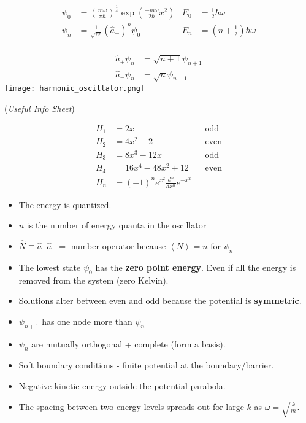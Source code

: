 \noindent\begin{align*}
    \psi_0 & = {\left(\frac{m\omega}{\pi\hbar}\right)}^{\frac{1}{4}}\exp\left(\frac{-m\omega}{2\hbar}x^2\right) & E_0 & = \frac{1}{2}\hbar\omega     \\
    \psi_n & = \frac{1}{\sqrt{n!}}{\left(\widehat{a}_{+}\right)}^n \psi_0                                       & E_n & = (n+\frac{1}{2})\hbar\omega \\
\end{align*}

\begin{align*}
    \widehat{a}_{+}\psi_n & = \sqrt{n+1}\psi_{n+1} \\
    \widehat{a}_{-}\psi_n & = \sqrt{n}\psi_{n-1}
\end{align*}
\texttt{[image: harmonic\_oscillator.png]}

 (\textit{Useful Info Sheet})

{\tiny\noindent\begin{align*}
        H_1 & = 2x                                         &  & \text{odd}  \\
        H_2 & = 4x^2-2                                     &  & \text{even} \\
        H_3 & = 8x^3-12x                                   &  & \text{odd}  \\
        H_4 & = 16x^4-48x^2+12                             &  & \text{even} \\
        H_n & = {(-1)}^n e^{x^2} \frac{d^n}{dx^n} e^{-x^2}
    \end{align*}
}

\begin{itemize}
    \item The energy is quantized.
    \item $n$ is the number of energy quanta in the oscillator
    \item $\widehat{N} \equiv \widehat{a}_{+}\widehat{a}_{-} = $ number operator because $\left<N\right> = n$ for $\psi_n$
    \item The lowest state $\psi_0$ has the \textbf{zero point energy}. Even if all the energy is removed from the system (zero Kelvin).
    \item Solutions alter between even and odd because the potential is \textbf{symmetric}.
    \item $\psi_{n+1}$ has one node more than $\psi_n$
    \item $\psi_n$ are mutually orthogonal + complete (form a basis).
    \item Soft boundary conditions - finite potential at the boundary/barrier.
    \item Negative kinetic energy outside the potential parabola.
    \item The spacing between two energy levels spreads out for large $k$ as $\omega=\sqrt{\frac{k}{m}}$.
\end{itemize}

